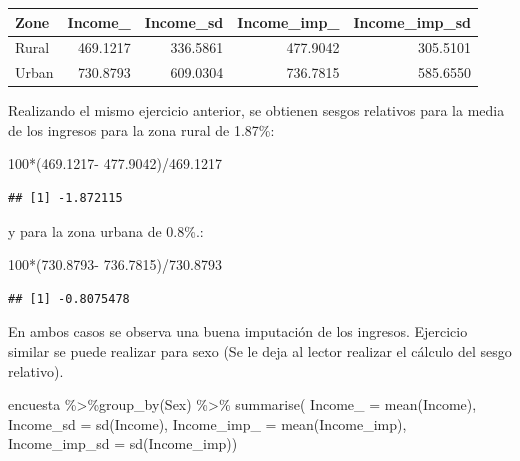 \documentclass[
  12pt,
]{book}
\newenvironment{Shaded}{\begin{snugshade}}{\end{snugshade}}
\newcommand{\AttributeTok}[1]{\textcolor[rgb]{0.77,0.63,0.00}{#1}}
\newcommand{\DecValTok}[1]{\textcolor[rgb]{0.00,0.00,0.81}{#1}}
\newcommand{\FloatTok}[1]{\textcolor[rgb]{0.00,0.00,0.81}{#1}}
\newcommand{\FunctionTok}[1]{\textcolor[rgb]{0.00,0.00,0.00}{#1}}
\newcommand{\NormalTok}[1]{#1}
\newcommand{\SpecialCharTok}[1]{\textcolor[rgb]{0.00,0.00,0.00}{#1}}
\begin{document}
\begin{tabular}{l|r|r|r|r}
\hline
Zone & Income\_ & Income\_sd & Income\_imp\_ & Income\_imp\_sd\\
\hline
Rural & 469.1217 & 336.5861 & 477.9042 & 305.5101\\
\hline
Urban & 730.8793 & 609.0304 & 736.7815 & 585.6550\\
\hline
\end{tabular}

Realizando el mismo ejercicio anterior, se obtienen sesgos relativos para la media de los ingresos para la zona rural de 1.87\%:

\begin{Shaded}
\begin{Highlighting}[]
\DecValTok{100}\SpecialCharTok{*}\NormalTok{(}\FloatTok{469.1217}\SpecialCharTok{{-}} \FloatTok{477.9042}\NormalTok{)}\SpecialCharTok{/}\FloatTok{469.1217}
\end{Highlighting}
\end{Shaded}

\begin{verbatim}
## [1] -1.872115
\end{verbatim}

y para la zona urbana de 0.8\%.:

\begin{Shaded}
\begin{Highlighting}[]
\DecValTok{100}\SpecialCharTok{*}\NormalTok{(}\FloatTok{730.8793}\SpecialCharTok{{-}} \FloatTok{736.7815}\NormalTok{)}\SpecialCharTok{/}\FloatTok{730.8793}
\end{Highlighting}
\end{Shaded}

\begin{verbatim}
## [1] -0.8075478
\end{verbatim}

En ambos casos se observa una buena imputación de los ingresos. Ejercicio similar se puede realizar para sexo (Se le deja al lector realizar el cálculo del sesgo relativo).

\begin{Shaded}
\begin{Highlighting}[]
\NormalTok{encuesta }\SpecialCharTok{\%\textgreater{}\%}\FunctionTok{group\_by}\NormalTok{(Sex) }\SpecialCharTok{\%\textgreater{}\%}  \FunctionTok{summarise}\NormalTok{(}
  \AttributeTok{Income\_ =} \FunctionTok{mean}\NormalTok{(Income),}
  \AttributeTok{Income\_sd =} \FunctionTok{sd}\NormalTok{(Income),}
  \AttributeTok{Income\_imp\_ =} \FunctionTok{mean}\NormalTok{(Income\_imp),}
  \AttributeTok{Income\_imp\_sd =} \FunctionTok{sd}\NormalTok{(Income\_imp))}
\end{Highlighting}
\end{Shaded}
\end{document}
